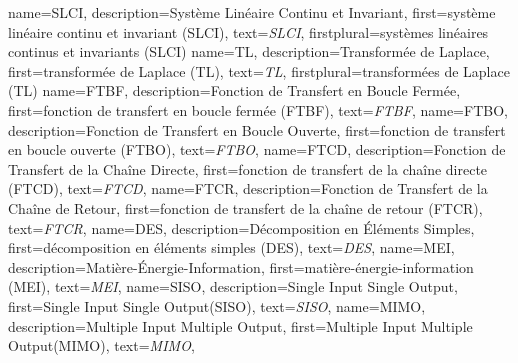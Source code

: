 {%
  name={SLCI},%
  description={Système Linéaire Continu et Invariant},%
  first={système\- lin\-éaire\- con\-tinu\- et\- in\-va\-riant\- (SLCI)},%
  text={\emph{{\scshape SLCI}}},%
  firstplural={systèmes\- linéaires\- continus\- et\- invariants\- (SLCI)}%
}
{%
  name={TL},%
  description={Transformée de Laplace},%
  first={transformée de Laplace (TL)},%
  text={\emph{{\scshape TL}}},%
  firstplural={transformées de Laplace (TL)}%
}
{%
  name={FTBF},%
  description={Fonction de Transfert en Boucle Fermée},%
  first={fonction de transfert en boucle fermée (FTBF)},%
  text={\emph{{\scshape FTBF}}},%
}
{%
  name={FTBO},%
  description={Fonction de Transfert en Boucle Ouverte},%
  first={fonction de transfert en boucle ouverte (FTBO)},%
  text={\emph{{\scshape FTBO}}},%
}
{%
  name={FTCD},%
  description={Fonction de Transfert de la Chaîne Directe},%
  first={fonction de transfert de la chaîne directe (FTCD)},%
  text={\emph{{\scshape FTCD}}},%
}
{%
  name={FTCR},%
  description={Fonction de Transfert de la Chaîne de Retour},%
  first={fonction de transfert de la chaîne de retour (FTCR)},%
  text={\emph{{\scshape FTCR}}},%
}
{%
  name={DES},%
  description={Décomposition en \'Eléments Simples},%
  first={décomposition en éléments simples (DES)},%
  text={\emph{{\scshape DES}}},%
}
{%
  name={MEI},%
  description={Matière-\'Energie-Information},%
  first={matière-énergie-information (MEI)},%
  text={\emph{{\scshape MEI}}},%
}
{%
  name={SISO},%
  description={Single Input Single Output},%
  first={\og Single Input Single Output\fg (SISO)},%
  text={\emph{{\scshape SISO}}},%
}
{%
  name={MIMO},%
  description={Multiple Input Multiple Output},%
  first={\og Multiple Input Multiple Output\fg (MIMO)},%
  text={\emph{{\scshape MIMO}}},%
}
